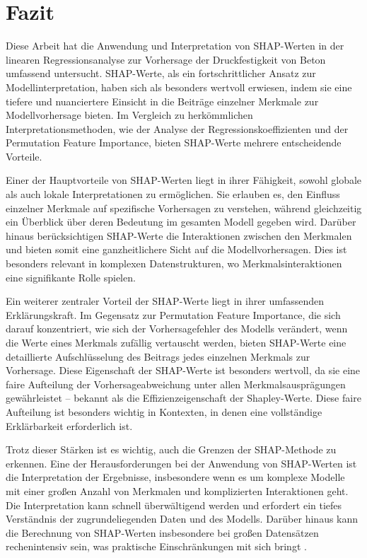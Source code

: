 \chapter{Fazit}

Diese Arbeit hat die Anwendung und Interpretation von SHAP-Werten in der 
linearen Regressionsanalyse zur Vorhersage der Druckfestigkeit von Beton umfassend untersucht. 
SHAP-Werte, als ein fortschrittlicher Ansatz zur Modellinterpretation, haben sich als besonders 
wertvoll erwiesen, indem sie eine tiefere und nuanciertere Einsicht in die Beiträge einzelner 
Merkmale zur Modellvorhersage bieten. Im Vergleich zu herkömmlichen Interpretationsmethoden, 
wie der Analyse der Regressionskoeffizienten und der Permutation Feature Importance, 
bieten SHAP-Werte mehrere entscheidende Vorteile.

Einer der Hauptvorteile von SHAP-Werten liegt in ihrer Fähigkeit, sowohl globale als auch 
lokale Interpretationen zu ermöglichen. Sie erlauben es, den Einfluss einzelner Merkmale auf 
spezifische Vorhersagen zu verstehen, während gleichzeitig ein Überblick über deren Bedeutung 
im gesamten Modell gegeben wird. Darüber hinaus berücksichtigen SHAP-Werte die Interaktionen 
zwischen den Merkmalen und bieten somit eine ganzheitlichere Sicht auf die Modellvorhersagen. 
Dies ist besonders relevant in komplexen Datenstrukturen, wo Merkmalsinteraktionen eine signifikante
Rolle spielen.

Ein weiterer zentraler Vorteil der SHAP-Werte liegt in ihrer umfassenden Erklärungskraft.
Im Gegensatz zur Permutation Feature Importance, die sich darauf konzentriert, wie sich der 
Vorhersagefehler des Modells verändert, wenn die Werte eines Merkmals zufällig vertauscht werden, 
bieten SHAP-Werte eine detaillierte Aufschlüsselung des Beitrags jedes einzelnen Merkmals zur 
Vorhersage. Diese Eigenschaft der SHAP-Werte ist besonders wertvoll, da sie eine faire 
Aufteilung der Vorhersageabweichung unter allen Merkmalsausprägungen gewährleistet – bekannt 
als die Effizienzeigenschaft der Shapley-Werte. Diese faire Aufteilung ist besonders wichtig 
in Kontexten, in denen eine vollständige Erklärbarkeit erforderlich ist.

Trotz dieser Stärken ist es wichtig, auch die Grenzen der SHAP-Methode zu erkennen. 
Eine der Herausforderungen bei der Anwendung von SHAP-Werten ist die Interpretation der Ergebnisse, 
insbesondere wenn es um komplexe Modelle mit einer großen Anzahl von Merkmalen und komplizierten 
Interaktionen geht. Die Interpretation kann schnell überwältigend werden und erfordert ein tiefes 
Verständnis der zugrundeliegenden Daten und des Modells. Darüber hinaus kann die Berechnung von 
SHAP-Werten insbesondere bei großen Datensätzen rechenintensiv sein, was praktische Einschränkungen 
mit sich bringt \cite[S. 224]{Molnar_2022}.

